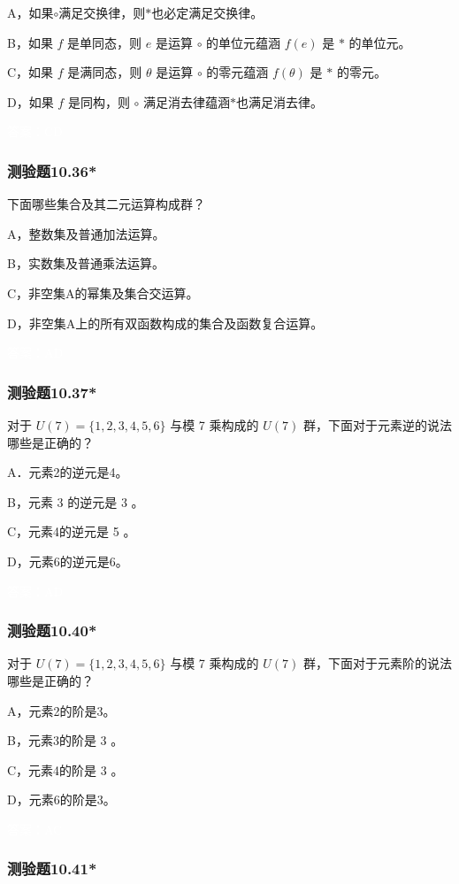 \documentclass[UTF8, heading=true]{ctexart}
\begin{document}
A，如果$\circ$满足交换律，则$*$也必定满足交换律。

B，如果 $f$ 是单同态，则 $e$ 是运算 $\circ$ 的单位元蕴涵 $f(e)$ 是 $*$ 的单位元。

C，如果 $f$ 是满同态，则 $\theta$ 是运算 $\circ$ 的零元蕴涵 $f(\theta)$ 是 $*$ 的零元。

D，如果 $f$ 是同构，则 $\circ$ 满足消去律蕴涵$*$也满足消去律。

\textcolor{white}{答案：CD}

\subsubsection{测验题10.36*}

下面哪些集合及其二元运算构成群？

A，整数集及普通加法运算。

B，实数集及普通乘法运算。

C，非空集A的幂集及集合交运算。

D，非空集A上的所有双函数构成的集合及函数复合运算。

\textcolor{white}{答案：AD}

\subsubsection{测验题10.37*}

对于 $U(7)=\{1,2,3,4,5,6\}$ 与模 7 乘构成的 $U(7)$ 群，下面对于元素逆的说法哪些是正确的？

A．元素2的逆元是4。

B，元素 3 的逆元是 3 。

C，元素4的逆元是 5 。

D，元素6的逆元是6。

\textcolor{white}{答案：AD}

\subsubsection{测验题10.40*}

对于 $U(7)=\{1,2,3,4,5,6\}$ 与模 7 乘构成的 $U(7)$ 群，下面对于元素阶的说法哪些是正确的？

A，元素2的阶是3。

B，元素3的阶是 3 。

C，元素4的阶是 3 。

D，元素6的阶是3。

\textcolor{white}{答案：AC}

\subsubsection{测验题10.41*}
\end{document}
